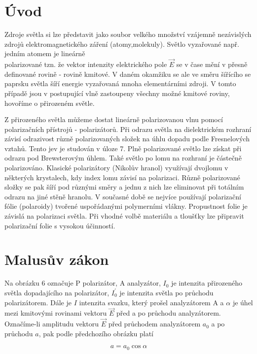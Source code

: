 \documentclass[czech,11pt,a4paper]{article}
\begin{document}
\begin{multicols}{2}
	\section*{Úvod}
	Zdroje světla si lze představit jako soubor velkého množství vzájemně nezávislých zdrojů elektromagnetického záření (atomy,molekuly). Světlo vyzařované např. jedním atomem je lineárně\\
	polarizované tzn. že vektor intenzity elektrického pole $\vec{E}$ se v čase mění v přesně definované rovině - rovině kmitové. V daném okamžiku se ale ve směru šířícího se paprsku světla šíří energie vyzařovaná mnoha elementárními zdroji. V tomto případě jsou v postupující vlně zastoupeny všechny možné kmitové roviny, hovoříme o přirozeném světle.
	
	Z přirozeného světla můžeme dostat lineárně polarizovanou vlnu pomocí polarizačních přístrojů - polarizátorů. Při odrazu světla na dielektrickém rozhraní závisí odrazivost různě polarizovaných složek na úhlu dopadu podle Fresnelových vztahů. Tento jev je studován v úloze 7. Plně polarizované světlo lze získat při odrazu pod Brewsterovým úhlem. Také světlo po lomu na rozhraní je částečně polarizováno. Klasické polarizátory (Nikolův hranol) využívají dvojlomu v některých krystalech, kdy index lomu závisí na polarizaci. Různě polarizované složky se pak šíří pod různými směry a jednu z nich lze eliminovat při totálním odrazu na jiné stěně hranolu. V současné době se nejvíce používají polarizační fólie (polaroidy) tvořené uspořádanými polymerními vlákny. Propustnost folie je závislá na polarizaci světla. Při vhodné volbě materiálu a tloušťky lze připravit polarizační folie s vysokou účinností.
	
	\section*{Malusův zákon}
	Na obrázku 6 označuje P polarizátor, A analyzátor, $I_{0}$ je intenzita přirozeného světla dopadajícího na polarizátor, $I_{0}^{\prime}$ je intenzita světla po průchodu polarizátorem. Dále je $I$ intenzita svazku, který prošel analyzátorem A a $\alpha$ je úhel mezi kmitovými rovinami vektoru $\vec{E}$ před a po průchodu analyzátorem. Označíme-li amplitudu vektoru $\vec{E}$ před průchodem analyzátorem $a_{0}$ a po průchodu $a$, pak podle předchozího obrázku platí
	
	
	\begin{equation}
		a=a_{0} \cos \alpha
	\end{equation}
	

\end{multicols}
\end{document}
